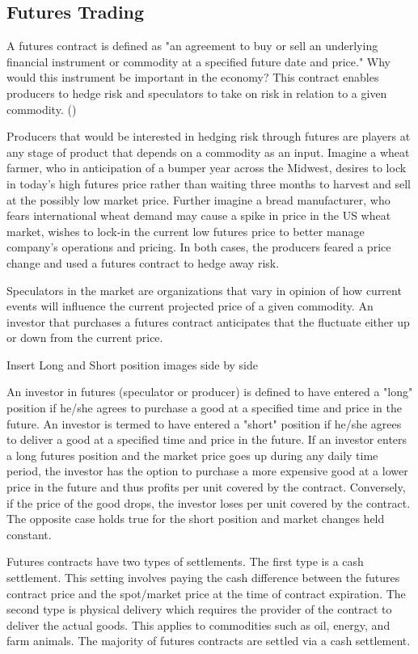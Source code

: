 \documentclass[twoside,11pt]{article}
\begin{document}
\subsection{Futures Trading}
	A futures contract is defined as "an agreement to buy or sell an underlying financial instrument or commodity at a specified future date and price." Why would this instrument be important in the economy? This contract enables producers to hedge risk and speculators to take on risk in relation to a given commodity. (\cite{InvestopediaF})
	
  Producers that would be interested in hedging risk through futures are players at any stage of product that depends on a commodity as an input. Imagine a wheat farmer, who in anticipation of a bumper year across the Midwest, desires to lock in today's high futures price rather than waiting three months to harvest and sell at the possibly low market price. Further imagine a bread manufacturer, who fears international wheat demand may cause a spike in price in the US wheat market, wishes to lock-in the current low futures price to better manage company's operations and pricing. In both cases, the producers feared a price change and used a futures contract to hedge away risk.
  
  Speculators in the market are organizations that vary in opinion of how current events will influence the current projected price of a given commodity. An investor that purchases a futures contract anticipates that the fluctuate either up or down from the current price.

  Insert Long and Short position images side by side

  An investor in futures (speculator or producer) is defined to have entered a "long" position if he/she agrees to purchase a good at a specified time and price in the future. An investor is termed to have entered a "short" position if he/she agrees to deliver a good at a specified time and price in the future. If an investor enters a long futures position and the market price goes up  during any daily time period, the investor has the option to purchase a more expensive good at a lower price in the future and thus profits  per unit covered by the contract. Conversely, if the price of the good drops, the investor loses  per unit covered by the contract. The opposite case holds true for the short position and market changes held constant.
  
  Futures contracts have two types of settlements. The first type is a cash settlement. This setting involves paying the cash difference between the futures contract price and the spot/market price at the time of contract expiration. The second type is physical delivery which requires the provider of the contract to deliver the actual goods. This applies to commodities such as oil, energy, and farm animals. The majority of futures contracts are settled via a cash settlement.
  
\end{document}
